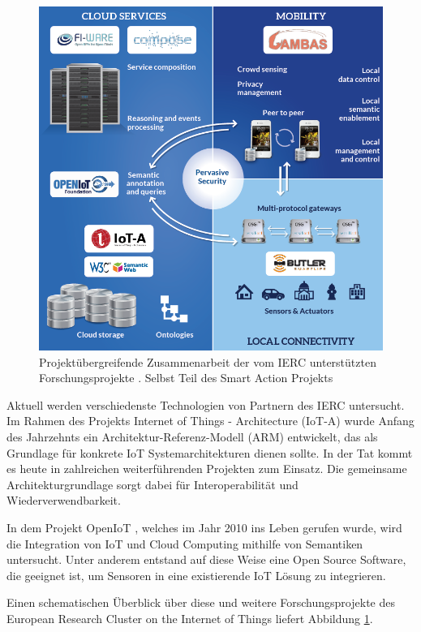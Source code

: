 \begin{figure}[t]
	\centering
	\includegraphics[width=\textwidth]{bilder/ierc}
	\caption{Projektübergreifende Zusammenarbeit der vom IERC unterstützten Forschungsprojekte \cite{ierc:portfolios}. Selbst Teil des Smart Action Projekts \cite{smartAction}}
	\label{fig:ierc}
\end{figure}

Aktuell werden verschiedenste Technologien von Partnern des IERC untersucht. Im Rahmen des Projekts \glqq Internet of Things - Architecture\grqq{} (IoT-A) wurde Anfang des Jahrzehnts ein Architektur-Referenz-Modell (ARM)\cite{iota:d15} entwickelt, das als Grundlage für konkrete IoT Systemarchitekturen dienen sollte. In der Tat kommt es heute in zahlreichen weiterführenden Projekten zum Einsatz. Die gemeinsame Architekturgrundlage sorgt dabei für Interoperabilität und Wiederverwendbarkeit.

In dem Projekt OpenIoT \cite{oiot}, welches im Jahr 2010 ins Leben gerufen wurde, wird die Integration von IoT und Cloud Computing mithilfe von Semantiken untersucht. Unter anderem entstand auf diese Weise eine Open Source Software, die geeignet ist, um Sensoren in eine existierende IoT Lösung zu integrieren.

Einen schematischen Überblick über diese und weitere Forschungsprojekte des European Research Cluster on the Internet of Things liefert Abbildung \ref{fig:ierc}.\\


